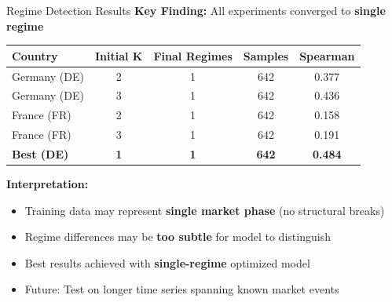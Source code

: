 \documentclass[aspectratio=169]{beamer}
\begin{document}
\begin{frame}{Regime Detection Results}
\textbf{Key Finding:} All experiments converged to \textbf{single regime}

\vspace{0.3cm}
\begin{table}
\centering
\begin{tabular}{l|c|c|c|c}
\toprule
\textbf{Country} & \textbf{Initial K} & \textbf{Final Regimes} & \textbf{Samples} & \textbf{Spearman} \\
\midrule
Germany (DE) & 2 & 1 & 642 & 0.377 \\
Germany (DE) & 3 & 1 & 642 & 0.436 \\
France (FR) & 2 & 1 & 642 & 0.158 \\
France (FR) & 3 & 1 & 642 & 0.191 \\
\midrule
\rowcolor{lightgray} \textbf{Best (DE)} & \textbf{1} & \textbf{1} & \textbf{642} & \textbf{0.484} \\
\bottomrule
\end{tabular}
\end{table}

\vspace{0.3cm}
\textbf{Interpretation:}
\begin{itemize}
    \item Training data may represent \textbf{single market phase} (no structural breaks)
    \item Regime differences may be \textbf{too subtle} for model to distinguish
    \item Best results achieved with \textbf{single-regime} optimized model
    \item Future: Test on longer time series spanning known market events
\end{itemize}
\end{frame}
\end{document}
